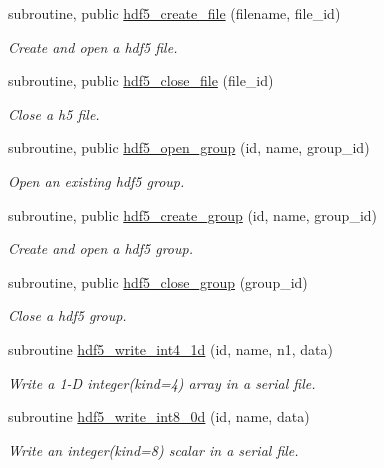 \begin{DoxyCompactItemize}
subroutine, public \hyperlink{namespacemodhdf5_a66cf3f318aafac811c2422f8155f7ae1}{hdf5\+\_\+create\+\_\+file} (filename, file\+\_\+id)
\begin{DoxyCompactList}\small\item\em Create and open a hdf5 file. \end{DoxyCompactList}\item 
subroutine, public \hyperlink{namespacemodhdf5_af70ee678ccdc5ce829431ebe909264a9}{hdf5\+\_\+close\+\_\+file} (file\+\_\+id)
\begin{DoxyCompactList}\small\item\em Close a h5 file. \end{DoxyCompactList}\item 
subroutine, public \hyperlink{namespacemodhdf5_ae547666d0167e2a78d6529e11c1faa92}{hdf5\+\_\+open\+\_\+group} (id, name, group\+\_\+id)
\begin{DoxyCompactList}\small\item\em Open an existing hdf5 group. \end{DoxyCompactList}\item 
subroutine, public \hyperlink{namespacemodhdf5_a5486f9c861f7b8ee2060015acf0169a4}{hdf5\+\_\+create\+\_\+group} (id, name, group\+\_\+id)
\begin{DoxyCompactList}\small\item\em Create and open a hdf5 group. \end{DoxyCompactList}\item 
subroutine, public \hyperlink{namespacemodhdf5_aba547bfdd3dc38385069b0885ab5d526}{hdf5\+\_\+close\+\_\+group} (group\+\_\+id)
\begin{DoxyCompactList}\small\item\em Close a hdf5 group. \end{DoxyCompactList}\item 
subroutine \hyperlink{namespacemodhdf5_a85487dfda18b03bd8b48100b016240b3}{hdf5\+\_\+write\+\_\+int4\+\_\+1d} (id, name, n1, data)
\begin{DoxyCompactList}\small\item\em Write a 1-\/D integer(kind=4) array in a serial file. \end{DoxyCompactList}\item 
subroutine \hyperlink{namespacemodhdf5_ac1a8b8e5ce7ef658ba72dab5853a855a}{hdf5\+\_\+write\+\_\+int8\+\_\+0d} (id, name, data)
\begin{DoxyCompactList}\small\item\em Write an integer(kind=8) scalar in a serial file. \end{DoxyCompactList}\item 

\end{DoxyCompactItemize}
